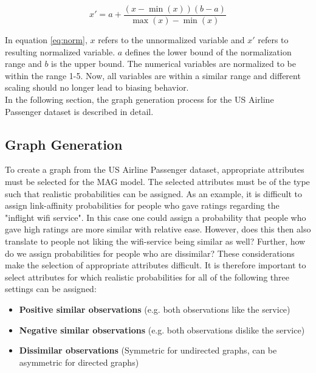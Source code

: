   \begin{equation}
    x' = a + \frac{(x - \min(x))(b - a)}{\max(x) - \min(x)}
    \label{eq:norm}
  \end{equation}

  \noindent In equation \ref{eq:norm}, $x$ refers to the unnormalized 
  variable and $x'$ refers to resulting normalized variable. $a$ defines 
  the lower bound of the normalization range and $b$ is the upper bound. The
  numerical variables are normalized to be within the range 1-5. Now, all 
  variables are within a similar range and different scaling should no longer 
  lead to biasing behavior. \\

  \noindent In the following section, the graph generation process for the US
  Airline Passenger dataset is described in detail.

  \subsection{Graph Generation}
  \label{section:graph_gen}

  To create a graph from the US Airline Passenger dataset, appropriate
  attributes must be selected for the MAG model. The selected attributes must be
  of the type such that realistic probabilities can be assigned. As an example, 
  it is difficult to assign link-affinity probabilities for people who gave 
  ratings regarding the "inflight wifi service". In this case one could assign 
  a probability that people who gave high ratings are more similar with 
  relative ease. However, does this then also translate to people not liking 
  the wifi-service being similar as well? Further, how do we assign 
  probabilities for people who are dissimilar? These considerations make the 
  selection of appropriate attributes difficult. It is therefore important to 
  select attributes for which realistic probabilities for all of the following
  three settings can be assigned:

  \begin{itemize}
    \item \textbf{Positive similar observations} (e.g. both observations like 
      the service)
    \item \textbf{Negative similar observations} (e.g. both observations 
      dislike the service)
    \item \textbf{Dissimilar observations} (Symmetric for undirected graphs, 
      can be asymmetric for directed graphs)
  \end{itemize}
 
